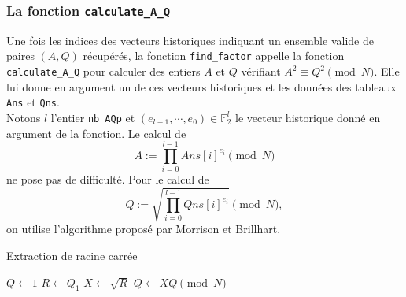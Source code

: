 \begin{algorithm}[H]
\end{algorithm}
\vspace{1em}

\subsubsection{La fonction \texttt{calculate\_A\_Q}}

Une fois les indices des vecteurs historiques indiquant un ensemble valide de
paires $(A, Q)$ récupérés, la fonction \texttt{find\_factor} appelle la
fonction \texttt{calculate\_A\_Q} pour calculer des entiers $A$ et $Q$
vérifiant $A^2 \equiv Q^2 \pmod{N}$. Elle lui donne en argument un de ces
vecteurs historiques et les données des tableaux \texttt{Ans} et \texttt{Qns}.
\\

Notons $l$ l'entier \texttt{nb\_AQp} et $(e_{l-1}, \cdots , e_0) \in
\mathbb{F}_2^{l}$ le vecteur historique donné en argument de la fonction. Le
calcul de \[A:= \prod_{i=0}^{l-1} Ans[i]^{e_i} \pmod{N} \] ne pose pas de
difficulté. Pour le calcul de \[Q:= \sqrt{\prod_{i=0}^{l-1 } Qns[i] ^{e_i}}
\pmod{N},\] on utilise l'algorithme proposé par Morrison et Brillhart.

\vspace{1em}
\begin{algorithm}[H]
\DontPrintSemicolon
\caption{\sc Extraction de racine carrée}
$Q \gets 1$\;
$R \gets Q_1$\;
$X \gets \sqrt{R}$\;
    $Q \gets XQ \pmod{N}$\;
\;
\end{algorithm}
\vspace{1em}

